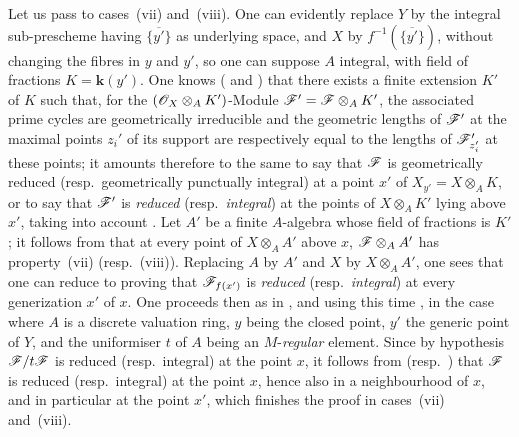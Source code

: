 \begin{env}[12.1.1.3]
\label{IV.12.1.1.3}
Let us pass to cases~(vii) and~(viii).
One can evidently replace $Y$ by the integral sub-prescheme having $\overline{\{y'\}}$ as underlying space, and $X$ by $f^{-1}(\overline{\{y'\}})$, without changing the fibres in $y$ and $y'$, so one can suppose $A$ integral, with field of fractions $K=\boldsymbol{k}(y')$.
One knows ( and ) that there exists a finite extension $K'$ of $K$ such that, for the $(\mathscr{O}_X\otimes_A K')$-Module $\mathscr{F}'=\mathscr{F}\otimes_A K'$, the associated prime cycles are geometrically irreducible and the geometric lengths of $\mathscr{F}'$ at the maximal points $z_i'$ of its support are respectively equal to the lengths of $\mathscr{F}'_{z_i'}$ at these points; it amounts therefore to the same to say that $\mathscr{F}$ is geometrically reduced (resp.\ geometrically punctually integral) at a point $x'$ of $X_{y'}=X\otimes_A K$, or to say that $\mathscr{F}'$ is \emph{reduced} (resp.\ \emph{integral}) at the points of $X\otimes_A K'$ lying above $x'$, taking into account .
Let $A'$ be a finite $A$-algebra whose field of fractions is $K'$; it follows from  that at every point of $X\otimes_A A'$ above $x$, $\mathscr{F}\otimes_A A'$ has property~(vii) (resp.~(viii)).
Replacing $A$ by $A'$ and $X$ by $X\otimes_A A'$, one sees that one can reduce to proving that $\mathscr{F}_{f(x')}$ is \emph{reduced} (resp.\ \emph{integral}) at every generization $x'$ of $x$.
One proceeds then as in , and using this time , in the case where $A$ is a discrete valuation ring, $y$ being the closed point, $y'$ the generic point of $Y$, and the uniformiser $t$ of $A$ being an $M$-\emph{regular} element.
Since by hypothesis $\mathscr{F}/t\mathscr{F}$ is reduced (resp.\ integral) at the point $x$, it follows from  (resp.\ ) that $\mathscr{F}$ is reduced (resp.\ integral) at the point $x$, hence also in a neighbourhood of $x$, and in particular at the point $x'$, which finishes the proof in cases~(vii) and~(viii).
\end{env}

